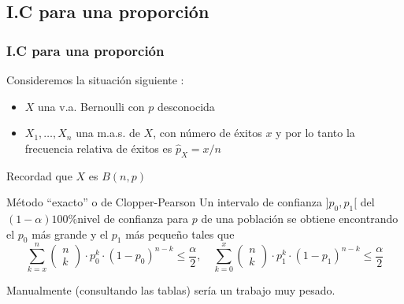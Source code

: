 \documentclass[12pt,t]{beamer}\usepackage[]{graphicx}\usepackage[]{color}
\renewcommand{\leq}{\leqslant}
\theoremstyle{plain}
\theoremstyle{definition}
\begin{document}
\subsection{I.C para una proporción }


\begin{frame}
\frametitle{I.C para una proporción}

Consideremos la situación siguiente  :
\begin{itemize}
\item  $X$ una v.a. Bernoulli con $p$ desconocida

\item $X_1,\ldots,X_n$ una m.a.s. de $X$, con número de éxitos  $x$ y por lo tanto la frecuencia relativa de éxitos  es $\widehat{p}_{X}=x/n$
\end{itemize}

Recordad que $X$ es $B(n,p)$
\scriptsize{
\begin{block}{Método ``exacto'' o de Clopper-Pearson}
Un intervalo de confianza  $]p_0,p_1[$ del $(1-\alpha)100\%$nivel de confianza para $p$ de una población se obtiene encontrando el $p_0$ más grande y el $p_1$ más pequeño tales que
$$
\displaystyle\sum_{k=x}^n 
\left(\begin{array}{c} n \\ k\end{array}\right)
\cdot p_0^k\cdot (1-p_0)^{n-k}\leq \frac{\alpha}{2},\quad
\displaystyle\sum_{k=0}^x \left(\begin{array}{c} n \\ k\end{array}\right)\cdot p_1^k\cdot(1-p_1)^{n-k}\leq \frac{\alpha}{2}
$$
\end{block}
Manualmente (consultando las tablas) sería un trabajo muy pesado.
}
\end{frame}

\end{document}
